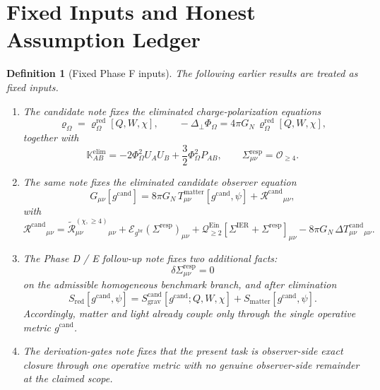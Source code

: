 \documentclass[11pt]{article}
\newcommand{\ProjSub}{P}
\newcommand{\ObserverMetric}{g^{\mathrm{br}}}
\newcommand{\CandidateMetric}{g^{\mathrm{cand}}}
\newcommand{\BaseShift}{\Sigma^{\mathrm{IER}}}
\newcommand{\ResponseShift}{\Sigma^{\mathrm{resp}}}
\newcommand{\AuxPol}{\mathbb K}
\newcommand{\FlowPot}{\Phi_\Omega}
\newcommand{\SourceDensity}{\varrho_\Omega}
\newcommand{\SourceDensityRed}{\varrho_\Omega^{\mathrm{red}}}
\newcommand{\EinLin}{\mathcal E_{\ObserverMetric}}
\newcommand{\EinQuad}{\mathcal Q_{\ge 2}^{\mathrm{Ein}}}
\newcommand{\MatterAct}{S_{\mathrm{matter}}}
\newcommand{\RedAct}{S_{\mathrm{red}}}
\newcommand{\RemCand}{\mathcal R^{\mathrm{cand}}}
\newcommand{\RemLongFour}{\widetilde{\mathcal R}_{\mu\nu}^{(\chi,\ge 4)}}
\newcommand{\DeltaTCand}{\Delta T_{\mu\nu}^{\mathrm{cand}}}
\newtheorem{definition}{Definition}
\begin{document}
\section{Fixed Inputs and Honest Assumption Ledger}

\begin{definition}[Fixed Phase F inputs]
\label{def:inputs}
The following earlier results are treated as fixed inputs.
\begin{enumerate}
    \item The candidate note fixes the eliminated charge-polarization equations
    \begin{equation}
    \SourceDensity=\SourceDensityRed[Q,W,\chi],
    \qquad
    -\Delta_\perp \FlowPot = 4\pi G_N\,\SourceDensityRed[Q,W,\chi],
    \label{eq:elimphi}
    \end{equation}
    together with
    \begin{equation}
    \AuxPol_{AB}^{\mathrm{elim}}
    =
    -2\FlowPot^2U_AU_B
    +\frac32\FlowPot^2\ProjSub_{AB},
    \qquad
    \ResponseShift_{\mu\nu}=\mathcal O_{\ge 4}.
    \label{eq:elimK}
    \end{equation}
    \item The same note fixes the eliminated candidate observer equation
    \begin{equation}
    G_{\mu\nu}[\CandidateMetric]
    =
    8\pi G_N\,T_{\mu\nu}^{\mathrm{matter}}[\CandidateMetric,\psi]
    +\RemCand{}_{\mu\nu},
    \label{eq:obseq}
    \end{equation}
    with
    \begin{equation}
    \RemCand{}_{\mu\nu}
    =
    \RemLongFour{}_{\mu\nu}
    +\EinLin(\ResponseShift)_{\mu\nu}
    +\EinQuad[\BaseShift+\ResponseShift]_{\mu\nu}
    -8\pi G_N\,\DeltaTCand{}_{\mu\nu}.
    \label{eq:remainder}
    \end{equation}
    \item The Phase D / E follow-up note fixes two additional facts:
    \begin{equation}
    \delta\ResponseShift_{\mu\nu}=0
    \label{eq:linearzero}
    \end{equation}
    on the admissible homogeneous benchmark branch, and after elimination
    \begin{equation}
    \RedAct[\CandidateMetric,\psi]
    =
    S_{\mathrm{grav}}^{\mathrm{cand}}[\CandidateMetric;Q,W,\chi]
    +\MatterAct[\CandidateMetric,\psi].
    \label{eq:redsplit}
    \end{equation}
    Accordingly, matter and light already couple only through the single operative metric \(\CandidateMetric\).
    \item The derivation-gates note fixes that the present task is observer-side exact closure through one operative metric with no genuine observer-side remainder at the claimed scope.
\end{enumerate}
\end{definition}
\end{document}
